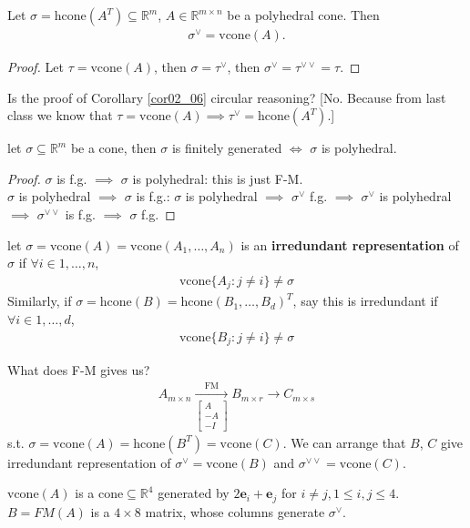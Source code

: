 \documentclass[a4paper,12pt]{amsart}
\newcommand{\RR}{\mathbb{R}}
\newcommand{\vA}{\begin{bmatrix}
		A\\
		-A\\
		-I
\end{bmatrix}}
\begin{document}
\begin{Corollary}
	\label{cor02_06}
Let $\sigma=\text{hcone}(A^T)\subseteq\RR^m$, $A\in\RR^{m\times n}$ be a polyhedral cone. Then
\begin{align*}
\sigma^{\vee}=\text{vcone}(A).
\end{align*}
\end{Corollary}
\begin{proof}
Let $\tau=\text{vcone}(A)$, then $\sigma=\tau^{\vee}$, then $\sigma^{\vee}=\tau^{\vee\vee}=\tau$.
\end{proof}

Is the proof of Corollary \ref{cor02_06} circular reasoning? [No. Because from last class we know that $\tau=\text{vcone}(A)\implies\tau^{\vee}=\text{hcone}(A^{T})$.]

\begin{Theorem}
let $\sigma\subseteq\RR^m$ be a cone, then $\sigma$ is finitely generated $\iff$ $\sigma$ is polyhedral.
\end{Theorem}
\begin{proof}
$\sigma$ is f.g. $\implies$ $\sigma$ is polyhedral: this is just F-M.\\
$\sigma$ is polyhedral $\implies$ $\sigma$ is f.g.:
$\sigma$ is polyhedral $\implies$ $\sigma^{\vee}$ f.g. $\implies$ $\sigma^{\vee}$ is polyhedral $\implies$ $\sigma^{\vee\vee}$ is f.g. $\implies$ $\sigma$ f.g.
\end{proof}

\begin{Def}
let $\sigma=\text{vcone}(A)=\text{vcone}(A_1,\dots, A_n)$ is an \textbf{irredundant representation} of $\sigma$ if $\forall i\in 1,\dots,n$,
\begin{align*}
\text{vcone}\{A_j:j\neq i\}\neq\sigma
\end{align*}
Similarly, if $\sigma=\text{hcone}(B)=\text{hcone}(B_1,\dots,B_d)^T$, say this is irredundant if $\forall i\in 1,\dots,d$,
\begin{align*}
\text{vcone}\{B_j:j\neq i\}\neq\sigma
\end{align*}
\end{Def}

What does F-M gives us?
\begin{align*}
A_{m\times n} \xrightarrow[\vA]{\text{FM}} B_{m\times r}\rightarrow C_{m\times s}
\end{align*}
s.t. $\sigma=\text{vcone}(A)=\text{hcone}(B^T)=\text{vcone}(C)$. We can arrange that $B$, $C$ give irredundant representation of $\sigma^{\vee}=\text{vcone}(B)$ and $\sigma^{\vee\vee}=\text{vcone}(C)$.
\begin{Eg}
	 $\text{vcone}(A)$ is a cone$\subseteq \RR^4$ generated by $2\mathbf{e}_i+\mathbf{e}_j$ for $i\neq j, 1\leq i,j\leq 4$.
	$B=FM(A)$ is a $4\times8$ matrix, whose columns generate $\sigma^{\vee}$.
\end{Eg}
\end{document}
